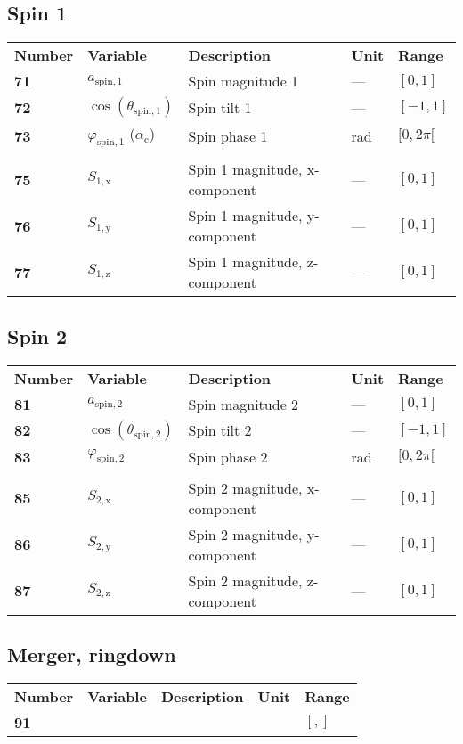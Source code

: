 \documentclass[10pt]{article}
\begin{document}
\subsection{Spin 1}
\begin{tabular}{lllll}
  \textbf{Number} & \textbf{Variable} & \textbf{Description} & \textbf{Unit} & \textbf{Range} \\
  \textbf{71} & $a_\mathrm{spin,1}$  & Spin magnitude 1 & --- & $[0,1]$ \\
  \textbf{72} & $\cos(\theta_\mathrm{spin,1})$  & Spin tilt 1 & --- & $[-1,1]$ \\
  \textbf{73} & $\varphi_\mathrm{spin,1}$  ($\alpha_\mathrm{c}$)  & Spin phase 1 & rad & $[0,2\pi[$ \\
      & & & & \\
  \textbf{75} & $S_\mathrm{1,x}$  & Spin 1 magnitude, x-component & --- & $[0,1]$ \\
  \textbf{76} & $S_\mathrm{1,y}$  & Spin 1 magnitude, y-component & --- & $[0,1]$ \\
  \textbf{77} & $S_\mathrm{1,z}$  & Spin 1 magnitude, z-component & --- & $[0,1]$ \\
\end{tabular}

\subsection{Spin 2}
\begin{tabular}{lllll}
  \textbf{Number} & \textbf{Variable} & \textbf{Description} & \textbf{Unit} & \textbf{Range} \\
  \textbf{81} & $a_\mathrm{spin,2}$  & Spin magnitude 2 & --- & $[0,1]$ \\
  \textbf{82} & $\cos(\theta_\mathrm{spin,2})$  & Spin tilt 2 & --- & $[-1,1]$ \\
  \textbf{83} & $\varphi_\mathrm{spin,2}$  & Spin phase 2 & rad & $[0,2\pi[$ \\
      & & & & \\
  \textbf{85} & $S_\mathrm{2,x}$  & Spin 2 magnitude, x-component & --- & $[0,1]$ \\
  \textbf{86} & $S_\mathrm{2,y}$  & Spin 2 magnitude, y-component & --- & $[0,1]$ \\
  \textbf{87} & $S_\mathrm{2,z}$  & Spin 2 magnitude, z-component & --- & $[0,1]$ \\
\end{tabular}

\subsection{Merger, ringdown}
\begin{tabular}{lllll}
  \textbf{Number} & \textbf{Variable} & \textbf{Description} & \textbf{Unit} & \textbf{Range} \\
  \textbf{91} &   & & & $[,]$ \\
\end{tabular}







\pagebreak

\end{document}
